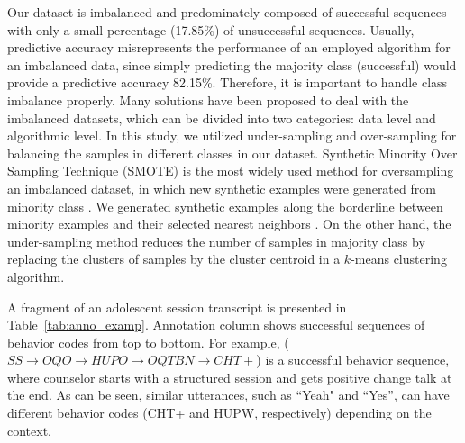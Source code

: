 \documentclass{amia_summit_2018}
\begin{document}
Our dataset is imbalanced and predominately composed of successful sequences with only a small percentage (17.85\%) of unsuccessful sequences. Usually, predictive accuracy misrepresents the
performance of an employed algorithm for an imbalanced data, since simply predicting the majority class (successful) would provide a predictive accuracy 82.15\%. Therefore, it is important to
handle class imbalance properly. Many solutions have been proposed to deal with the imbalanced datasets, which can be divided into two categories: data level and algorithmic level. In this study, we
utilized under-sampling and over-sampling for balancing the samples in different classes in our dataset. Synthetic Minority Over Sampling Technique (SMOTE) is the most widely used
method for oversampling an imbalanced dataset, in which new synthetic examples were generated from minority class \cite{chawla2002smote}. We generated synthetic examples along the borderline between
minority examples and their selected nearest neighbors \cite{nguyen2011borderline}. On the other hand, the under-sampling method reduces the number of samples in majority class by replacing the
clusters of samples by the cluster centroid in a $k$-means clustering algorithm.

A fragment of an adolescent session transcript is presented in Table~\ref{tab:anno_examp}. Annotation column shows successful sequences of behavior codes from top to bottom. For example,
($SS\rightarrow OQO\rightarrow HUPO\rightarrow OQTBN\rightarrow CHT+$) is a successful behavior sequence, where counselor starts with a structured session and gets positive change talk at the end. As
can be seen, similar utterances, such as  ``Yeah" and ``Yes'', can have different behavior codes (CHT+ and HUPW, respectively) depending on the context.\\
\end{document}
